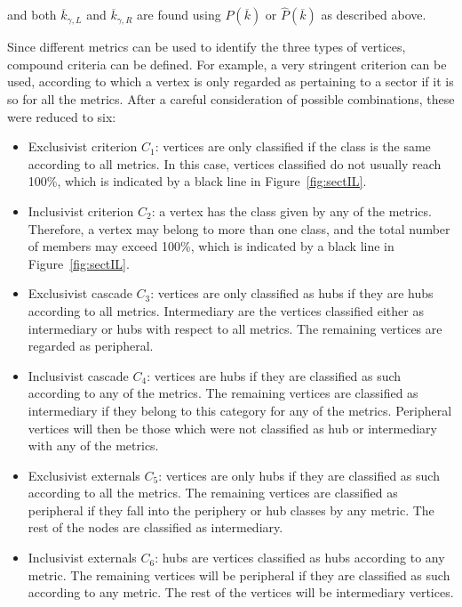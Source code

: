 \documentclass[%
	aip,
	jmp,%
	amsmath,amssymb,
	reprint,%
]{revtex4-1}
\begin{document}
\noindent and both $\overline{k}_{\gamma,L}$ and $\overline{k}_{\gamma,R}$ are found using $P(\overline{k})$ or $\hat{P}(\overline{k})$ as described above.

Since different metrics can be used to identify the three types of vertices, compound criteria can be defined. For example, a very stringent criterion can be used, according to which a vertex is only regarded as pertaining to a sector if it is so for all the metrics. After a careful consideration of possible combinations, these were reduced to six:

\begin{itemize}
	\item Exclusivist criterion $C_1$:  vertices are only classified if the class is the same according to all metrics. In this case, vertices classified do not usually reach 100\%, which is indicated by a black line in Figure~\ref{fig:sectIL}.
	\item Inclusivist criterion $C_2$: a vertex has the class given by any of the metrics. Therefore, a vertex may belong to more than one class, and the total number of members may exceed 100\%, which is indicated by a black line in Figure~\ref{fig:sectIL}.
	\item Exclusivist cascade $C_3$: vertices are only classified as hubs if they are hubs according to all metrics. Intermediary are the vertices classified either as intermediary or hubs with respect to all metrics. The remaining vertices are regarded as peripheral.
	\item Inclusivist cascade $C_4$: vertices are hubs if they are classified as such according to any of the metrics. The remaining vertices are classified as intermediary if they belong to this category for any of the metrics. Peripheral vertices will then be those which were not classified as hub or intermediary with any of the metrics. 
	\item Exclusivist externals $C_5$: vertices are only hubs if they are classified as such according to all the metrics. The remaining vertices are classified as peripheral if they fall into the periphery or hub classes by any metric. The rest of the nodes are classified as intermediary.
	\item Inclusivist externals $C_6$: hubs are vertices classified as hubs according to any metric. The remaining vertices will be peripheral if they are classified as such according to any metric. The rest of the vertices will be intermediary vertices.
\end{itemize}
\end{document}
